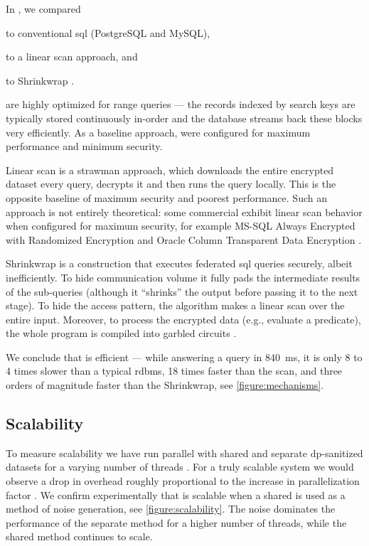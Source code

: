 			In \cite{epsolute}, we compared \epsolute{}
			\begin{enumerate*}[label=(\alph*)] %
				\item to conventional \acrshort{sql}  (PostgreSQL and MySQL),
				\item to a linear scan approach, and
				\item to Shrinkwrap \cite{shrinkwrap}.
			\end{enumerate*}

			 are highly optimized for range queries --- the records indexed by search keys are typically stored continuously in-order and the database streams back these blocks very efficiently.
			As a baseline approach,  were configured for maximum performance and minimum security.

			Linear scan is a strawman approach, which downloads the entire encrypted dataset every query, decrypts it and then runs the query locally.
			This is the opposite baseline of maximum security and poorest performance.
			Such an approach is not entirely theoretical: some commercial  exhibit linear scan behavior when configured for maximum security, for example MS-SQL Always Encrypted with Randomized Encryption \cite{mssql-always-enc} and Oracle Column Transparent Data Encryption \cite{oracle-tde}.

			Shrinkwrap \cite{shrinkwrap} is a construction that executes federated \acrshort{sql} queries securely, albeit inefficiently.
			To hide communication volume it fully pads the intermediate results of the sub-queries (although it ``shrinks'' the output before passing it to the next stage).
			To hide the access pattern, the algorithm makes a linear scan over the entire input.
			Moreover, to process the encrypted data (e.g., evaluate a predicate), the whole program is compiled into garbled circuits \cite{yao-circuits,emp-toolkit}.

			

			We conclude that \epsolute{} is efficient --- while answering a query in \SI{840}{\milli\second}, it is only 8 to 4 times slower than a typical \acrlong{rdbms}, 18 times faster than the scan, and three orders of magnitude faster than the Shrinkwrap, see \cref{figure:mechanisms}.

		\subsection{Scalability}

			To measure scalability we have run parallel \epsolute{} with shared and separate \acrshort{dp}-sanitized datasets \serverDS{} for a varying number of threads \oramsNumber{}.
			For a truly scalable system we would observe a drop in overhead roughly proportional to the increase in parallelization factor \oramsNumber{}.
			We confirm experimentally that \epsolute{} is scalable when a shared \serverDS{} is used as a method of noise generation, see \cref{figure:scalability}.
			The noise dominates the performance of the separate \serverDS{} method for a higher number of threads, while the shared \serverDS{} method continues to scale.

			
